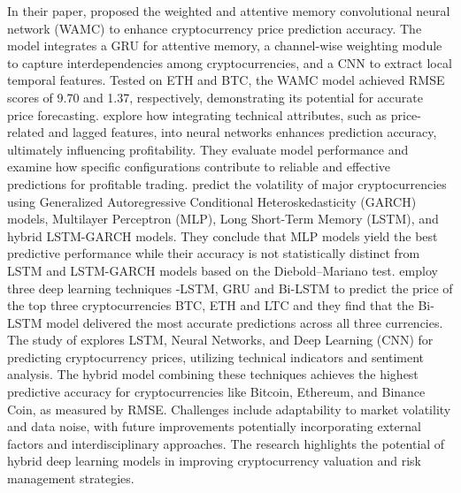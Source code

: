 \documentclass{dsfe}
\begin{document}
In their paper, \citep{zhang2021} proposed the weighted and attentive memory convolutional neural network (WAMC) to enhance cryptocurrency price prediction accuracy. The model integrates a GRU for attentive memory, a channel-wise weighting module to capture interdependencies among cryptocurrencies, and a CNN to extract local temporal features. Tested on ETH and BTC, the WAMC model achieved RMSE scores of 9.70 and 1.37, respectively, demonstrating its potential for accurate price forecasting. \citep{aghashahi2023} explore how integrating technical attributes, such as price-related and lagged features, into neural networks enhances prediction accuracy, ultimately influencing profitability. They evaluate model performance and examine how specific configurations contribute to reliable and effective predictions for profitable trading. \citep{garcia2024} predict the volatility of major cryptocurrencies using Generalized Autoregressive Conditional Heteroskedasticity (GARCH) models, Multilayer Perceptron (MLP), Long Short-Term Memory (LSTM), and hybrid LSTM-GARCH models. They conclude that MLP models yield the best predictive performance while their accuracy is not statistically distinct from LSTM and LSTM-GARCH models based on the Diebold–Mariano test. \citep{seabe2023} employ three deep learning techniques -LSTM, GRU and Bi-LSTM to predict the price of the top three cryptocurrencies BTC, ETH and LTC and they find that the Bi-LSTM model delivered the most accurate predictions across all three currencies.  The study of \citep{xiang2024} explores LSTM, Neural Networks, and Deep Learning (CNN) for predicting cryptocurrency prices, utilizing technical indicators and sentiment analysis. The hybrid model combining these techniques achieves the highest predictive accuracy for cryptocurrencies like Bitcoin, Ethereum, and Binance Coin, as measured by RMSE. Challenges include adaptability to market volatility and data noise, with future improvements potentially incorporating external factors and interdisciplinary approaches. The research highlights the potential of hybrid deep learning models in improving cryptocurrency valuation and risk management strategies.
\end{document}
